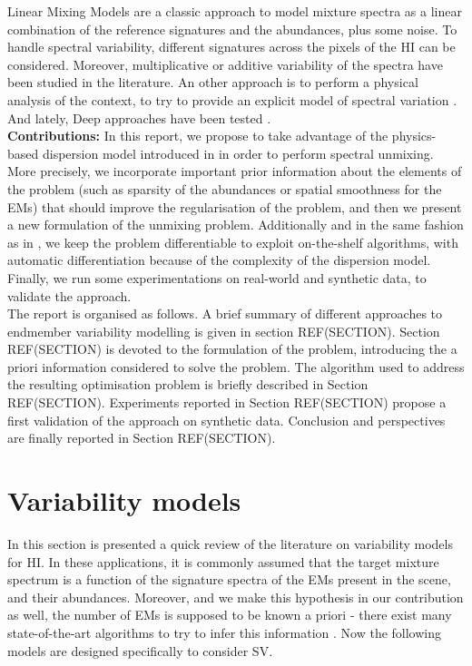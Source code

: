 \documentclass{article}
\begin{document}
Linear Mixing Models \citep{LMM} are a classic approach to model mixture spectra as a linear combination of the reference signatures and the abundances, plus some noise. To handle spectral variability, different signatures across the pixels of the HI can be considered. Moreover, multiplicative \citep{veganzones2014} or additive \citep{johnson2013} variability of the spectra have been studied in the literature. An other approach is to perform a physical analysis of the context, to try to provide an explicit model of spectral variation \citep{janiczek_differentiable_2020,griffin2003}. And lately, Deep approaches have been tested \citep{borsoi_deep_2019}.\\

\textbf{Contributions:}
In this report, we propose to take advantage of the physics-based dispersion model introduced in \citet{janiczek_differentiable_2020} in order to perform spectral unmixing. More precisely, we incorporate important prior information about the elements of the problem (such as sparsity of the abundances or spatial smoothness for the EMs) that should improve the regularisation of the problem, and then we present a new formulation of the unmixing problem. Additionally and in the same fashion as in \citet{janiczek_differentiable_2020}, we keep the problem differentiable to exploit on-the-shelf algorithms, with automatic differentiation because of the complexity of the dispersion model. Finally, we run some experimentations on real-world and synthetic data, to validate the approach.\\

The report is organised as follows. A brief summary of different approaches to endmember variability modelling is given in section REF(SECTION). Section REF(SECTION) is devoted to the formulation of the problem, introducing the a priori information considered to solve the problem. The algorithm used to address the resulting optimisation problem is briefly described in Section REF(SECTION). Experiments reported in Section REF(SECTION) propose a first validation of the approach on synthetic data. Conclusion and perspectives are finally reported in Section REF(SECTION).

\section{Variability models}
In this section is presented a quick review of the literature on variability models for HI. In these applications, it is commonly assumed that the target mixture spectrum is a function of the signature spectra of the EMs present in the scene, and their abundances. Moreover, and we make this hypothesis in our contribution as well, the number of EMs is supposed to be known a priori - there exist many state-of-the-art algorithms to try to infer this information \citep{bioucas2008}. Now the following models are designed specifically to consider SV.
\end{document}
